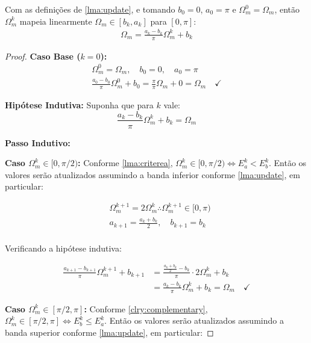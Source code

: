\vspace{1cm}
\begin{lemma}
\label{lma:mapping}
Com as definições de \ref{lma:update}, e tomando $b_0 = 0$, $a_0 = \pi$ e
$\Omega_m^0 = \Omega_m$, então $\Omega_m^k$ mapeia linearmente
$\Omega_m \in [b_k, a_k]$ para $[0,\pi]$:
\begin{align*}
    \Omega_m = \frac{a_k - b_k}{\pi}\Omega_m^k + b_k
\end{align*}
\begin{proof}

    \textbf{Caso Base ($k=0$):}
    \begin{align*}
        \Omega_m^0 = \Omega_m,\quad b_0 = 0,\quad a_0 = \pi\\
        \frac{a_0 - b_0}{\pi}\Omega_m^0 + b_0 = \frac{\pi}{\pi}\Omega_m + 0 = \Omega_m \quad\checkmark
    \end{align*}
    
    \textbf{Hipótese Indutiva:} Suponha que para $k$ vale:
    $$\frac{a_k-b_k}{\pi}\Omega_m^k + b_k = \Omega_m$$

    \textbf{Passo Indutivo:}
    
    \medskip
    \textbf{Caso $\Omega_m^k \in [0,\pi/2)$:} Conforme \ref{lma:criterea}, $\Omega_m^k \in [0,\pi/2) \iff E_a^k < E_b^k$. Então os valores serão atualizados assumindo a banda inferior conforme \ref{lma:update}, em particular:
    
    \begin{align*}
        &\Omega_m^{k+1} = 2\Omega_m^k \therefore \Omega_m^{k+1} \in [0,\pi)\\
        &a_{k+1} = \frac{a_k+b_k}{2},\quad b_{k+1}=b_k\\
    \end{align*}

    Verificando a hipótese indutiva:

    \begin{align*}
        \frac{a_{k+1}-b_{k+1}}{\pi}\Omega_m^{k+1}+b_{k+1}
        &= \frac{\frac{a_k+b_k}{2}-b_{k}}{\pi}\cdot 2\Omega_m^{k}+b_{k}\\ 
        &= \frac{a_k-b_{k}}{\pi}\Omega_m^{k}+b_{k} = \Omega_m \quad\checkmark
    \end{align*}

    \medskip
    \textbf{Caso $\Omega_m^k \in [\pi/2,\pi]$:} Conforme \ref{clry:complementary}, $\Omega_m^k \in [\pi/2,\pi] \iff E_b^k \leq E_a^k$. Então os valores serão atualizados assumindo a banda superior conforme \ref{lma:update}, em particular:


\end{proof}
\end{lemma}
